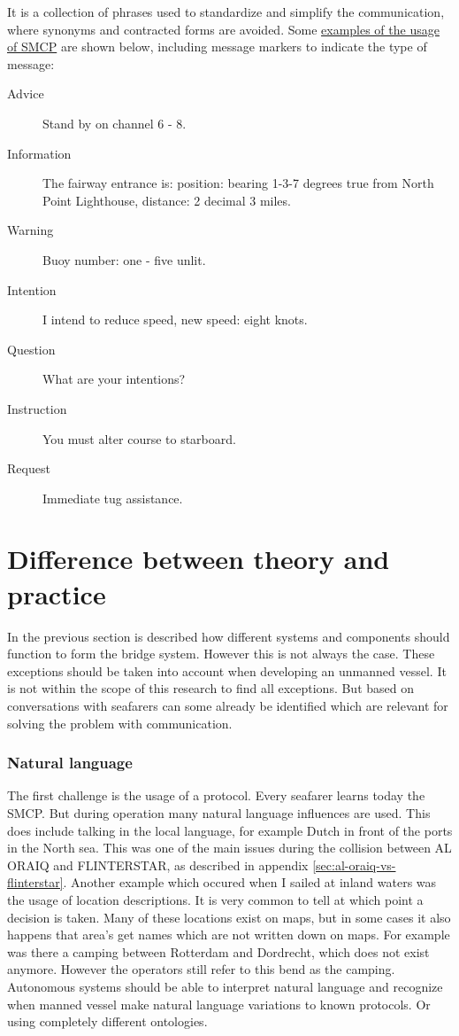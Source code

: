 It is a collection of phrases used to standardize and simplify the communication, where synonyms and contracted forms are avoided. Some \href{http://www.segeln.co.at/media/pdf/smcp.pdf}{examples of the usage of \ac{SMCP}} are shown below, including message markers to indicate the type of message:
\begin{description}
	\item [Advice] Stand by on channel 6 - 8.
	\item [Information] The fairway entrance is: position: bearing 1-3-7 degrees true from North Point Lighthouse, distance: 2 decimal 3 miles.
	\item [Warning] Buoy number: one - five unlit.
	\item [Intention] I intend to reduce speed, new speed: eight knots.
	\item [Question] What are your intentions?
	\item [Instruction] You must alter course to starboard.
	\item [Request] Immediate tug assistance.
\end{description}

\section{Difference between theory and practice}
In the previous section is described how different systems and components should function to form the bridge system. However this is not always the case. These exceptions should be taken into account when developing an unmanned vessel. It is not within the scope of this research to find all exceptions. But based on conversations with seafarers can some already be identified which are relevant for solving the problem with communication.

\subsubsection{Natural language}
The first challenge is the usage of a protocol. Every seafarer learns today the \acf{SMCP}. But during operation many natural language influences are used. This does include talking in the local language, for example Dutch in front of the ports in the North sea. This was one of the main issues during the collision between AL ORAIQ and FLINTERSTAR, as described in appendix \ref{sec:al-oraiq-vs-flinterstar}.
Another example which occured when I sailed at inland waters was the usage of location descriptions. It is very common to tell at which point a decision is taken. Many of these locations exist on maps, but in some cases it also happens that area's get names which are not written down on maps. For example was there a camping between Rotterdam and Dordrecht, which does not exist anymore. However the operators still refer to this bend as the camping.
Autonomous systems should be able to interpret natural language and recognize when manned vessel make natural language variations to known protocols. Or using completely different ontologies. 

